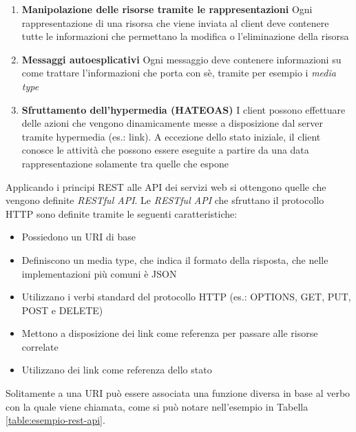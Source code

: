 \begin{itemize}
\begin{enumerate}
		\item \textbf{Manipolazione delle risorse tramite le rappresentazioni} Ogni rappresentazione di una risorsa che viene inviata al client deve contenere tutte le informazioni che permettano la modifica o l'eliminazione della risorsa
		\item \textbf{Messaggi autoesplicativi} Ogni messaggio deve contenere informazioni su come trattare l'informazioni che porta con sè, tramite per esempio i \emph{media type}
		\item \textbf{Sfruttamento dell'hypermedia (HATEOAS)} I client possono effettuare delle azioni che vengono dinamicamente messe a disposizione dal server tramite hypermedia (es.: link). A eccezione dello stato iniziale, il client conosce le attività che possono essere eseguite a partire da una data rappresentazione solamente tra quelle che espone
	\end{enumerate}
\end{itemize}

Applicando i principi REST alle API dei servizi web si ottengono quelle che vengono definite \emph{RESTful API}. Le \emph{RESTful API} che sfruttano il protocollo HTTP sono definite tramite le seguenti caratteristiche:

\begin{itemize}
	\item Possiedono un URI di base
	\item Definiscono un media type, che indica il formato della risposta, che nelle implementazioni più comuni è JSON
	\item Utilizzano i verbi standard del protocollo HTTP (es.: OPTIONS, GET, PUT, POST e DELETE)
	\item Mettono a disposizione dei link come referenza per passare alle risorse correlate
	\item Utilizzano dei link come referenza dello stato
\end{itemize}

Solitamente a una URI può essere associata una funzione diversa in base al verbo con la quale viene chiamata, come si può notare nell'esempio in Tabella \ref{table:esempio-rest-api}.

